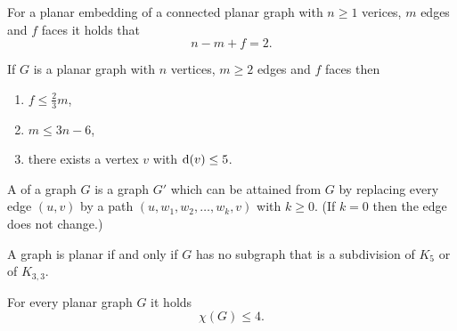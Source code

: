 \begin{theorem}[Euler]
    For a planar embedding of a connected planar graph with $n \ge 1$ verices, $m$ edges and $f$ faces it holds that
    \[
        n - m + f = 2.
    \]
\end{theorem}

\begin{lemma}
    If $G$ is a planar graph with $n$ vertices, $m \ge 2$ edges and $f$ faces then
    \begin{enumerate}[label=(\roman*)]
        \item $f \le \frac 2 3 m$,
        \item $m \le 3n-6$,
        \item there exists a vertex $v$ with $\mathop{}\!\mathrm{d} (v) \le 5$.
    \end{enumerate}
\end{lemma}

\begin{definition}
    A  of a graph $G$ is a graph $G'$ which can be attained from $G$ by replacing every edge $(u,v)$ by a path $(u, w_1, w_2, \dots, w_k, v)$ with $k \ge 0$.
    (If $k=0$ then the edge does not change.)
\end{definition}

\begin{theorem}[Kuratowski]
    A graph is planar if and only if $G$ has no subgraph that is a subdivision of $K_5$ or of $K_{3,3}$.
\end{theorem}

\begin{theorem}
    For every planar graph $G$ it holds
    \[
        \chi(G) \le 4.
    \]
\end{theorem}
